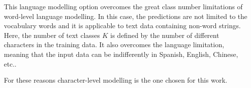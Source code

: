 This language modelling option overcomes the great class number limitations of word-level language modelling. In this case, the predictions are not limited to the vocabulary words and it is applicable to text data containing non-word strings. Here, the number of text classes $K$ is defined by the number of different characters in the training data. It also overcomes the language limitation, meaning that the input data can be indifferently in Spanish, English, Chinese, etc.. 

For these reasons character-level modelling is the one chosen for this work.

 


